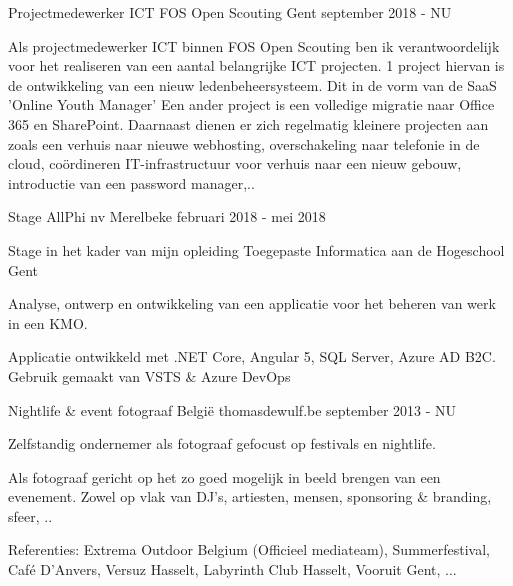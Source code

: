 


\begin{cventries}

\cventry
{Projectmedewerker ICT} %
{FOS Open Scouting} %
{Gent} %
{september 2018 - NU} %
{ %
\begin{cvitems}
\item {Als projectmedewerker ICT binnen FOS Open Scouting ben ik verantwoordelijk voor het realiseren van een aantal belangrijke ICT projecten.
1 project hiervan is de ontwikkeling van een nieuw ledenbeheersysteem. Dit in de vorm van de SaaS 'Online Youth Manager' Een ander project is een volledige migratie naar Office 365 en SharePoint.
Daarnaast dienen er zich regelmatig kleinere projecten aan zoals een verhuis naar nieuwe webhosting, overschakeling naar telefonie in de cloud, coördineren IT-infrastructuur voor verhuis naar een nieuw gebouw, introductie van een password manager,..}
\end{cvitems}
}


\cventry
{Stage} %
{AllPhi nv} %
{Merelbeke} %
{februari 2018 - mei 2018} %
{ %
\begin{cvitems}
\item {Stage in het kader van mijn opleiding Toegepaste Informatica aan de Hogeschool Gent }
\item {Analyse, ontwerp en ontwikkeling van een applicatie voor het beheren van werk in een KMO.}
\item {Applicatie ontwikkeld met .NET Core, Angular 5, SQL Server, Azure AD B2C. Gebruik gemaakt van VSTS & Azure DevOps}
\end{cvitems}
}

\cventry
{Nightlife \& event fotograaf} %
{België} %
{thomasdewulf.be} %
{september 2013 - NU} %
{ %
\begin{cvitems}
\item {Zelfstandig ondernemer als fotograaf gefocust op festivals en nightlife. }
\item {Als fotograaf gericht op het zo goed mogelijk in beeld brengen van een evenement. Zowel op vlak van DJ's, artiesten, mensen, sponsoring \& branding, sfeer, ..}
\item {Referenties: Extrema Outdoor Belgium (Officieel mediateam), Summerfestival, Café D'Anvers, Versuz Hasselt, Labyrinth Club Hasselt, Vooruit Gent, ...}
\end{cvitems}
}


\end{cventries}
